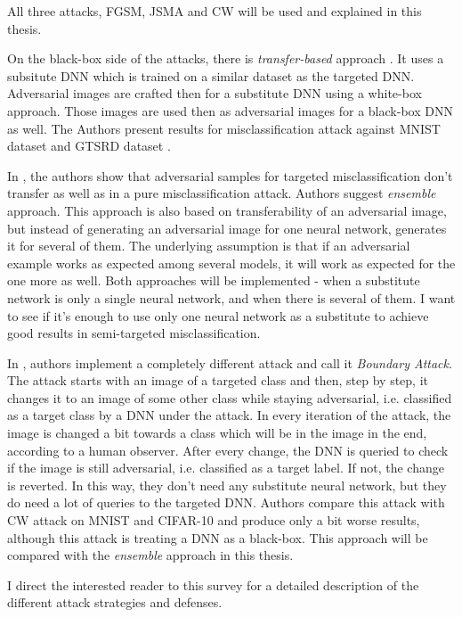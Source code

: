 All three attacks, FGSM, JSMA and CW will be used and explained in this thesis.

On the black-box side of the attacks, there is \textit{transfer-based} approach 
\cite{DBLP:journals/corr/PapernotMGJCS16}. It uses a subsitute DNN which is trained on a similar dataset as the targeted DNN. Adversarial images are crafted then for a substitute DNN using a white-box approach. Those images are used then as adversarial images for a black-box DNN as well.
The Authors present results for misclassification attack against MNIST dataset and GTSRD dataset \cite{datasetGTSRD}. 

In \cite{ensemble-attack}, the authors show that adversarial samples for targeted misclassification don't transfer as well as in a pure misclassification attack. Authors suggest \textit{ensemble} approach. This approach is also based on transferability of an adversarial image, but instead of generating an adversarial image for one neural network, generates it for several of them. The underlying assumption is that if an adversarial example works as expected among several models, it will work as expected for the one more as well. Both approaches will be implemented - when a substitute network is only a single neural network, and when there is several of them. I want to see if it's enough to use only one neural network as a substitute to achieve good results in semi-targeted misclassification.

In \cite{brendel2018decisionbased}, authors implement a completely different attack and call it \textit{Boundary Attack}. The attack starts with an image of a targeted class and then, step by step, it changes it to an image of some other class while staying adversarial, i.e. classified as a target class by a DNN under the attack. In every iteration of the attack, the image is changed a bit towards a class which will be in the image in the end, according to a human observer. After every change, the DNN is queried to check if the image is still adversarial, i.e. classified as a target label. If not, the change is reverted. In this way, they don't need any substitute neural network, but they do need a lot of queries to the targeted DNN. Authors compare this attack with CW attack on MNIST and CIFAR-10 and produce only a bit worse results, although this attack is treating a DNN as a black-box. This approach will be compared with the \textit{ensemble} approach in this thesis.

I direct the interested reader to this survey for a detailed description \cite{survey} of the different attack strategies and defenses.